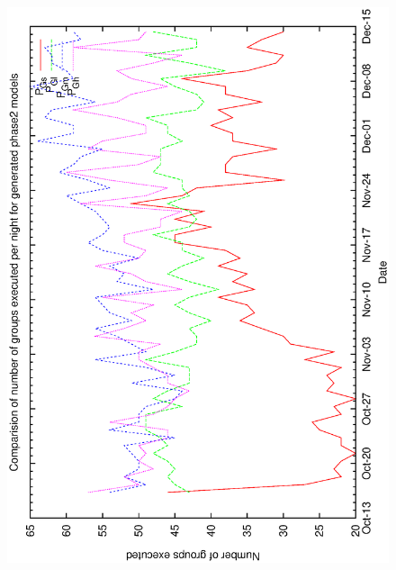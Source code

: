 \begin{figure}[h]
\begin{center}
{   \includegraphics[scale=0.25, angle=-90]{figures/c60_gen_ng.eps}
  }
\end{center}
\end{figure}
